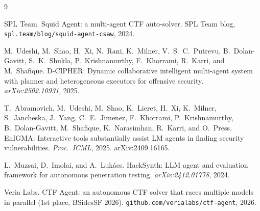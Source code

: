\documentclass[10pt,twocolumn]{article}
\begin{document}
{\small
\begin{thebibliography}{9}

SPL Team.
\newblock Squid Agent: a multi-agent CTF auto-solver.
\newblock SPL Team blog, \texttt{spl.team/blog/squid-agent-csaw}, 2024.

M.~Udeshi, M.~Shao, H.~Xi, N.~Rani, K.~Milner, V.~S.~C.~Putrevu, B.~Dolan-Gavitt, S.~K.~Shukla,
P.~Krishnamurthy, F.~Khorrami, R.~Karri, and M.~Shafique.
\newblock D-CIPHER: Dynamic collaborative intelligent multi-agent system with planner and heterogeneous
executors for offensive security.
\newblock \emph{arXiv:2502.10931}, 2025.

T.~Abramovich, M.~Udeshi, M.~Shao, K.~Lieret, H.~Xi, K.~Milner, S.~Jancheska, J.~Yang, C.~E.~Jimenez,
F.~Khorrami, P.~Krishnamurthy, B.~Dolan-Gavitt, M.~Shafique, K.~Narasimhan, R.~Karri, and O.~Press.
\newblock EnIGMA: Interactive tools substantially assist LM agents in finding security vulnerabilities.
\newblock \emph{Proc.\ ICML}, 2025. arXiv:2409.16165.

L.~Muzsai, D.~Imolai, and A.~Luk\'{a}cs.
\newblock HackSynth: LLM agent and evaluation framework for autonomous penetration testing.
\newblock \emph{arXiv:2412.01778}, 2024.

Veria Labs.
\newblock CTF Agent: an autonomous CTF solver that races multiple models in parallel (1st place, BSidesSF
2026).
\newblock \texttt{github.com/verialabs/ctf-agent}, 2026.

\end{thebibliography}
}
\end{document}
